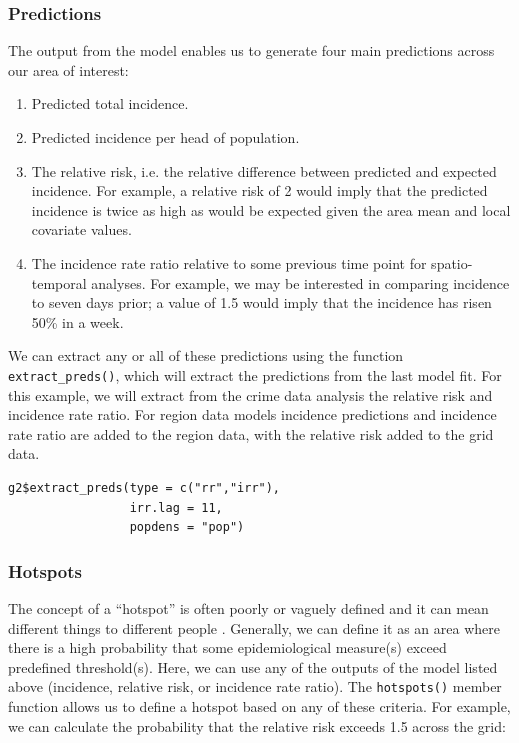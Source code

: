 \subsubsection{Predictions}
The output from the model enables us to generate four main predictions across our area of interest:
\begin{enumerate}
    \item Predicted total incidence.
    \item Predicted incidence per head of population.
    \item The relative risk, i.e. the relative difference between predicted and expected incidence. For example, a relative risk of 2 would imply that the predicted incidence is twice as high as would be expected given the area mean and local covariate values.
    \item The incidence rate ratio relative to some previous time point for spatio-temporal analyses. For example, we may be interested in comparing incidence to seven days prior; a value of 1.5 would imply that the incidence has risen 50\% in a week.
\end{enumerate}
We can extract any or all of these predictions using the function \texttt{extract\_preds()}, which will extract the predictions from the last model fit. For this example, we will extract from the crime data analysis the relative risk and incidence rate ratio. For region data models incidence predictions and incidence rate ratio are added to the region data, with the relative risk added to the grid data. 

\begin{lstlisting}
g2$extract_preds(type = c("rr","irr"),
                 irr.lag = 11,
                 popdens = "pop")
\end{lstlisting}

\subsubsection{Hotspots}
The concept of a ``hotspot'' is often poorly or vaguely defined and it can mean different things to different people \citep{Lessler2017}. Generally, we can define it as an area where there is a high probability that some epidemiological measure(s) exceed predefined threshold(s). Here, we can use any of the outputs of the model listed above (incidence, relative risk, or incidence rate ratio). The \texttt{hotspots()} member function allows us to define a hotspot based on any of these criteria. For example, we can calculate the probability that the relative risk exceeds 1.5 across the grid:

